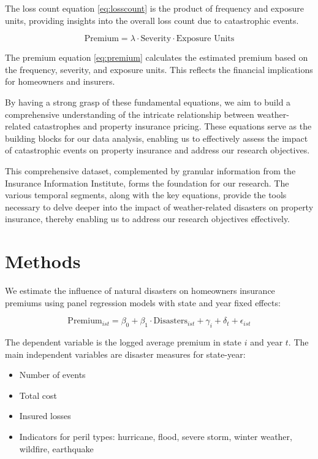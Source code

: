\documentclass[12pt]{article}
\begin{document}
The loss count equation \ref{eq:losscount} is the product of frequency and exposure units, providing insights into the overall loss count due to catastrophic events.

\begin{equation}
    \label{eq:premium}
    \text{Premium} = \lambda \cdot \text{Severity} \cdot \text{Exposure Units}
\end{equation}

The premium equation \ref{eq:premium} calculates the estimated premium based on the frequency, severity, and exposure units. This 
reflects the financial implications for homeowners and insurers.

By having a strong grasp of these fundamental equations, we aim to build a comprehensive understanding of the intricate relationship 
between weather-related catastrophes and property insurance pricing. These equations serve as the building blocks for our data 
analysis, enabling us to effectively assess the impact of catastrophic events on property insurance and address our research 
objectives.

This comprehensive dataset, complemented by granular information from the Insurance Information Institute, forms the foundation for 
our research. The various temporal segments, along with the key equations, provide the tools necessary to delve deeper into the 
impact of weather-related disasters on property insurance, thereby enabling us to address our research objectives effectively. 



\section{Methods}
\label{sec:meth}
We estimate the influence of natural disasters on homeowners insurance premiums using panel regression models with state and year 
fixed effects:

\begin{equation} 
    \mathrm{Premium}_{ist} = \beta_0 + \beta_1 \cdot \mathrm{Disasters}_{ist} + \gamma_i + \delta_t + \epsilon_{ist}
\end{equation}

The dependent variable is the logged average premium in state $i$ and year $t$. The main independent variables are disaster measures 
for state-year:

\begin{itemize} 
    \item Number of events 
    \item Total cost 
    \item Insured losses 
    \item Indicators for peril types: hurricane, flood, severe storm, winter weather, wildfire, earthquake 
\end{itemize}
\end{document}

